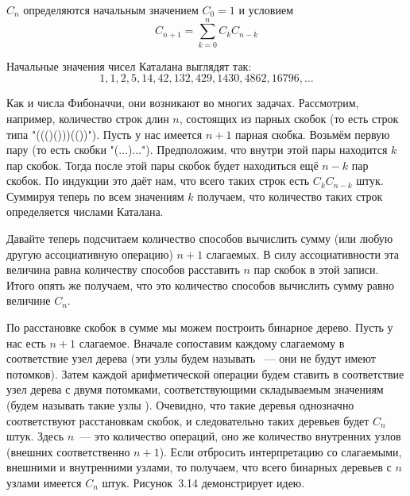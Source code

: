\begin{definition}
 $C_n$ определяются начальным значением $C_0 = 1$ и условием
$$C_{n+1} = \sum_{k=0}^n C_kC_{n-k}$$
\end{definition}

Начальные значения чисел Каталана выглядят так:
$$1, 1, 2, 5, 14, 42, 132, 429, 1430, 4862, 16796, \ldots$$

Как и числа Фибоначчи, они возникают во многих задачах. Рассмотрим, например, количество строк длин $n$, состоящих из парных скобок (то есть строк типа "((()()))(())"). Пусть у нас имеется $n+1$ парная скобка. Возьмём первую пару (то есть скобки "(...)..."). Предположим, что внутри этой пары находится $k$ пар скобок. Тогда после этой пары скобок будет находиться ещё $n-k$ пар скобок. По индукции это даёт нам, что всего таких строк есть $C_kC_{n-k}$ штук. Суммируя теперь по всем значениям $k$ получаем, что количество таких строк определяется числами Каталана.

Давайте теперь подсчитаем количество способов вычислить сумму (или любую другую ассоциативную операцию) $n+1$ слагаемых. В силу ассоциативности эта величина равна количеству способов расставить $n$ пар скобок в этой записи. Итого опять же получаем, что это количество способов вычислить сумму равно величине $C_n$.

По расстановке скобок в сумме мы можем построить бинарное дерево. Пусть у нас есть $n+1$ слагаемое. Вначале сопоставим каждому слагаемому в соответствие узел дерева (эти узлы будем называть ~— они не будут имеют потомков). Затем каждой арифметической операции будем ставить в соответствие узел дерева с двумя потомками, соответствующими складываемым значениям (будем называть такие узлы ). Очевидно, что такие деревья однозначно соответствуют расстановкам скобок, и следовательно таких деревьев будет $C_n$ штук. Здесь $n$~— это количество операций, оно же количество внутренних узлов (внешних соответственно $n+1$). Если отбросить интерпретацию со слагаемыми, внешними и внутренними узлами, то получаем, что всего бинарных деревьев с $n$ узлами имеется $C_n$ штук. Рисунок~3.14 демонстрирует идею.

